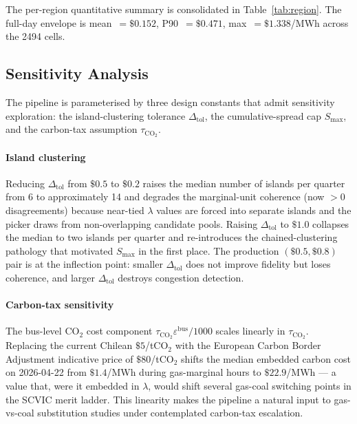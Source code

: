 The per-region quantitative summary is consolidated in
Table~\ref{tab:region}.  The full-day envelope is
mean~$=\$0.152$, P90~$=\$0.471$, max~$=\$1.338$/MWh across the
\num{2494} cells.

\begin{table}[t]
  \centering
  \caption{Reconstruction error $|\hat\lambda -
  \lambda^{\mathrm{CEN}}|$ in \si{\USD\per\MWh} for 2026-04-22,
  disaggregated by region.}
  \label{tab:region}
  
\end{table}

\subsection{Sensitivity Analysis}
\label{sec:cases-sens}

The pipeline is parameterised by three design constants that admit
sensitivity exploration: the island-clustering tolerance
$\Delta_{\mathrm{tol}}$, the cumulative-spread cap $S_{\max}$, and
the carbon-tax assumption $\tau_{\mathrm{CO}_2}$.

\paragraph{Island clustering}
Reducing $\Delta_{\mathrm{tol}}$ from $\$0.5$ to $\$0.2$ raises
the median number of islands per quarter from \num{6} to
approximately \num{14} and degrades the marginal-unit coherence
(now $>0$ disagreements) because near-tied $\lambda$ values are
forced into separate islands and the picker draws from
non-overlapping candidate pools.  Raising $\Delta_{\mathrm{tol}}$
to $\$1.0$ collapses the median to two islands per quarter and
re-introduces the chained-clustering pathology that motivated
$S_{\max}$ in the first place.  The production
$(\$0.5, \$0.8)$ pair is at the inflection point: smaller
$\Delta_{\mathrm{tol}}$ does not improve fidelity but loses
coherence, and larger $\Delta_{\mathrm{tol}}$ destroys congestion
detection.

\paragraph{Carbon-tax sensitivity}
The bus-level CO$_2$ cost component
$\tau_{\mathrm{CO}_2}\varepsilon^{\mathrm{bus}}/1000$ scales
linearly in $\tau_{\mathrm{CO}_2}$.  Replacing the current
Chilean $\$5$/tCO$_2$ with the European Carbon Border Adjustment
indicative price of $\$80$/tCO$_2$ shifts the median embedded
carbon cost on 2026-04-22 from $\$1.4$/MWh during gas-marginal
hours to $\$22.9$/MWh — a value that, were it embedded in
$\lambda$, would shift several gas-coal switching points in the
SCVIC merit ladder.  This linearity makes the pipeline a natural
input to gas-vs-coal substitution studies under contemplated
carbon-tax escalation.

